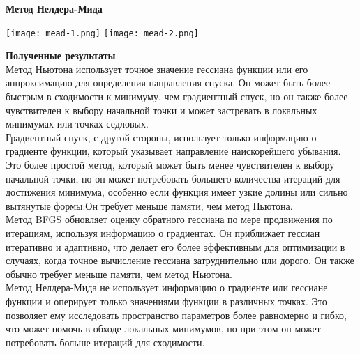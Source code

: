 \documentclass{article}
\begin{document}
\noindent \textbf{Метод Нелдера-Мида}
\begin{center}
    \texttt{[image: mead-1.png]}
    \texttt{[image: mead-2.png]}
    \label{fig:enter-label}
\end{center}

\noindent \textbf{Полученные результаты} \\

\noindent Метод Ньютона использует точное значение гессиана функции или его аппроксимацию для определения направления спуска. Он может быть более быстрым в сходимости к минимуму, чем градиентный спуск, но он также более чувствителен к выбору начальной точки и может застревать в локальных минимумах или точках седловых.\\ 

\noindent Градиентный спуск, с другой стороны, использует только информацию о градиенте функции, который указывает направление наискорейшего убывания. Это более простой метод, который может быть менее чувствителен к выбору начальной точки, но он может потребовать большего количества итераций для достижения минимума, особенно если функция имеет узкие долины или сильно вытянутые формы.Он требует меньше памяти, чем метод Ньютона.\\

\noindent Метод BFGS обновляет оценку обратного гессиана по мере продвижения по итерациям, используя информацию о градиентах. Он приближает гессиан итеративно и адаптивно, что делает его более эффективным для оптимизации в случаях, когда точное вычисление гессиана затруднительно или дорого. Он также обычно требует меньше памяти, чем метод Ньютона.\\

\noindent Метод Нелдера-Мида не использует информацию о градиенте или гессиане функции и оперирует только значениями функции в различных точках. Это позволяет ему исследовать пространство параметров более равномерно и гибко, что может помочь в обходе локальных минимумов, но при этом он может потребовать больше итераций для сходимости.\\
\end{document}
